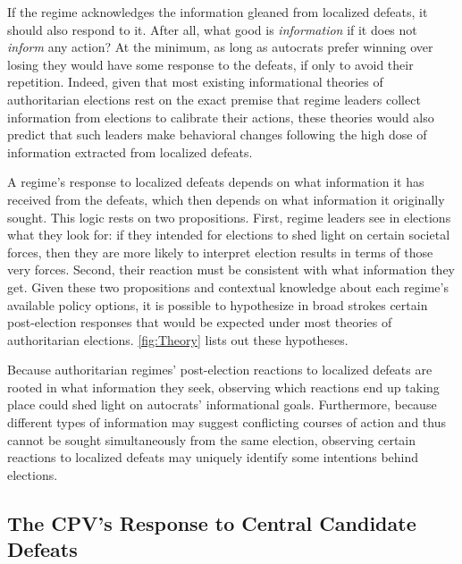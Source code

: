 \documentclass[12pt]{article}
\newcommand\fnote[1]{\footnote{\baselineskip=2\normalbaselineskip#1}}
\newcommand{\1}{\mathbbm{1}}
\let\footnote=\endnote
\begin{document}
If the regime acknowledges the information gleaned from localized defeats, it should also respond to it. After all, what good is \textit{information} if it does not \textit{inform} any action? At the minimum, as long as autocrats prefer winning over losing they would have some response to the defeats, if only to avoid their repetition. Indeed, given that most existing informational theories of authoritarian elections rest on the exact premise that regime leaders collect information from elections to calibrate their actions, these theories would also predict that such leaders make behavioral changes following the high dose of information extracted from localized defeats. 

A regime's response to localized defeats depends on what information it has received from the defeats, which then depends on what information it originally sought. This logic rests on two propositions. First, regime leaders see in elections what they look for: if they intended for elections to shed light on certain societal forces, then they are more likely to interpret election results in terms of those very forces. Second, their reaction must be consistent with what information they get. Given these two propositions and contextual knowledge about each regime's available policy options, it is possible to hypothesize in broad strokes certain post-election responses that would be expected under most theories of authoritarian elections. \autoref{fig:Theory} lists out these hypotheses.%

Because authoritarian regimes' post-election reactions to localized defeats are rooted in what information they seek, observing which reactions end up taking place could shed light on autocrats' informational goals. Furthermore, because different types of information may suggest conflicting courses of action and thus cannot be sought simultaneously from the same election, observing certain reactions to localized defeats may uniquely identify some intentions behind elections. 

\afterpage{%

}

\subsection*{The CPV's Response to Central Candidate Defeats}
\label{sec:vietnam_local_defeat}
\end{document}
